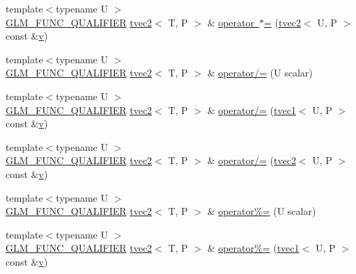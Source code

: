 \begin{DoxyCompactItemize}
\item 
{\footnotesize template$<$typename U $>$ }\\\mbox{\hyperlink{setup_8hpp_a33fdea6f91c5f834105f7415e2a64407}{G\+L\+M\+\_\+\+F\+U\+N\+C\+\_\+\+Q\+U\+A\+L\+I\+F\+I\+ER}} \mbox{\hyperlink{structglm_1_1tvec2}{tvec2}}$<$ T, P $>$ \& \mbox{\hyperlink{structglm_1_1tvec2_a2aa935237d57dceed6e47dfb9c8247df}{operator $\ast$=}} (\mbox{\hyperlink{structglm_1_1tvec2}{tvec2}}$<$ U, P $>$ const \&\mbox{\hyperlink{glad_8h_a14cfbe2fc2234f5504618905b69d1e06}{v}})
\item 
{\footnotesize template$<$typename U $>$ }\\\mbox{\hyperlink{setup_8hpp_a33fdea6f91c5f834105f7415e2a64407}{G\+L\+M\+\_\+\+F\+U\+N\+C\+\_\+\+Q\+U\+A\+L\+I\+F\+I\+ER}} \mbox{\hyperlink{structglm_1_1tvec2}{tvec2}}$<$ T, P $>$ \& \mbox{\hyperlink{structglm_1_1tvec2_a50542837f7d732334ecf178403a4100b}{operator/=}} (U scalar)
\item 
{\footnotesize template$<$typename U $>$ }\\\mbox{\hyperlink{setup_8hpp_a33fdea6f91c5f834105f7415e2a64407}{G\+L\+M\+\_\+\+F\+U\+N\+C\+\_\+\+Q\+U\+A\+L\+I\+F\+I\+ER}} \mbox{\hyperlink{structglm_1_1tvec2}{tvec2}}$<$ T, P $>$ \& \mbox{\hyperlink{structglm_1_1tvec2_a19b74b0db17121ccf51b68fc25e579a2}{operator/=}} (\mbox{\hyperlink{structglm_1_1tvec1}{tvec1}}$<$ U, P $>$ const \&\mbox{\hyperlink{glad_8h_a14cfbe2fc2234f5504618905b69d1e06}{v}})
\item 
{\footnotesize template$<$typename U $>$ }\\\mbox{\hyperlink{setup_8hpp_a33fdea6f91c5f834105f7415e2a64407}{G\+L\+M\+\_\+\+F\+U\+N\+C\+\_\+\+Q\+U\+A\+L\+I\+F\+I\+ER}} \mbox{\hyperlink{structglm_1_1tvec2}{tvec2}}$<$ T, P $>$ \& \mbox{\hyperlink{structglm_1_1tvec2_a572fa5d63392fd44f7bbdd35cbed43ca}{operator/=}} (\mbox{\hyperlink{structglm_1_1tvec2}{tvec2}}$<$ U, P $>$ const \&\mbox{\hyperlink{glad_8h_a14cfbe2fc2234f5504618905b69d1e06}{v}})
\item 
{\footnotesize template$<$typename U $>$ }\\\mbox{\hyperlink{setup_8hpp_a33fdea6f91c5f834105f7415e2a64407}{G\+L\+M\+\_\+\+F\+U\+N\+C\+\_\+\+Q\+U\+A\+L\+I\+F\+I\+ER}} \mbox{\hyperlink{structglm_1_1tvec2}{tvec2}}$<$ T, P $>$ \& \mbox{\hyperlink{structglm_1_1tvec2_ab4ffac9c9fc45f4156d271accb5920a7}{operator\%=}} (U scalar)
\item 
{\footnotesize template$<$typename U $>$ }\\\mbox{\hyperlink{setup_8hpp_a33fdea6f91c5f834105f7415e2a64407}{G\+L\+M\+\_\+\+F\+U\+N\+C\+\_\+\+Q\+U\+A\+L\+I\+F\+I\+ER}} \mbox{\hyperlink{structglm_1_1tvec2}{tvec2}}$<$ T, P $>$ \& \mbox{\hyperlink{structglm_1_1tvec2_aea6f1233a9ef7b8c12cee037fa5f7b9d}{operator\%=}} (\mbox{\hyperlink{structglm_1_1tvec1}{tvec1}}$<$ U, P $>$ const \&\mbox{\hyperlink{glad_8h_a14cfbe2fc2234f5504618905b69d1e06}{v}})

\end{DoxyCompactItemize}
